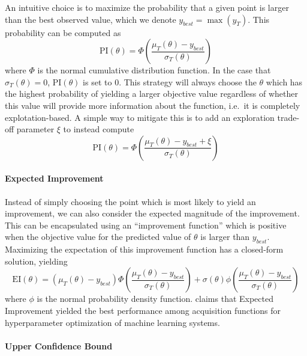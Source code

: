 An intuitive choice is to maximize the probability that a given point is larger than the best observed value, which we denote $y_{best} = \max(y_T)$.
This probability can be computed as
\begin{equation}
        \mathrm{PI}(\theta) = \Phi\left(\frac{\mu_T(\theta) - y_{best}}{\sigma_T(\theta)}\right)
        \label{eq:probability_of_improvement}
\end{equation}
where $\Phi$ is the normal cumulative distribution function.
In the case that $\sigma_T(\theta) = 0$, $\mathrm{PI}(\theta)$ is set to $0$.
This strategy will always choose the $\theta$ which has the highest probability of yielding a larger objective value regardless of whether this value will provide more information about the function, i.e.\ it is completely explotation-based.
A simple way to mitigate this is to add an exploration trade-off parameter $\xi$ to instead compute
\begin{equation}
        \mathrm{PI}(\theta) = \Phi\left(\frac{\mu_T(\theta) - y_{best} + \xi}{\sigma_T(\theta)}\right)
\end{equation}

\paragraph{Expected Improvement}

Instead of simply choosing the point which is most likely to yield an improvement, we can also consider the expected magnitude of the improvement.
This can be encapsulated using an ``improvement function'' which is positive when the objective value for the predicted value of $\theta$ is larger than $y_{best}$.
Maximizing the expectation of this improvement function has a closed-form solution, yielding
\begin{equation}
        \mathrm{EI}(\theta) = (\mu_T(\theta) - y_{best})\Phi\left(\frac{\mu_T(\theta) - y_{best}}{\sigma_T(\theta)}\right) + \sigma(\theta)\phi\left(\frac{\mu_T(\theta) - y_{best}}{\sigma_T(\theta)}\right)
\end{equation}
where $\phi$ is the normal probability density function.
\cite{snoek2012practical} claims that Expected Improvement yielded the best performance among acquisition functions for hyperparameter optimization of machine learning systems.

\paragraph{Upper Confidence Bound}

